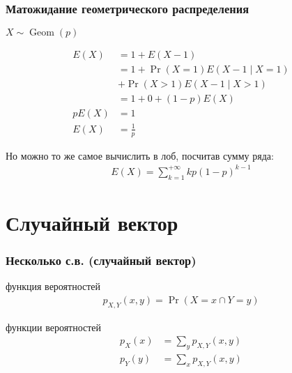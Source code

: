\documentclass[hyperref=unicode,graphics=pdflatex,13pt,xcolor={usenames,dvipsnames}]{beamer}
\renewcommand\emph[1]{{\color{blue}{#1}}}
\DeclareMathOperator{\Geom}{Geom}
\begin{document}
\begin{frame}
  \frametitle{Матожидание геометрического распределения}

  $X \sim \Geom(p)$

  \begin{align*}
    E(X)  &= 1 + E(X - 1) \\
          &= 1 + \Pr(X = 1) E(X - 1 \mid X = 1) \\
          &+ \Pr(X > 1) E(X - 1 \mid X > 1) \\
          &= 1 + 0 + (1 - p) E(X) \\
    pE(X) &= 1 \\
    E(X)  &= \frac{1}{p}
  \end{align*}

  \pause
  Но можно то же самое вычислить в лоб, посчитав сумму ряда:
  \begin{align*}
    E(X) = \sum_{k = 1}^{+\infty} k p(1 - p)^{k - 1}
  \end{align*}

\end{frame}

\section{Случайный вектор}
\begin{frame}
  \frametitle{Несколько с.в. (случайный вектор)}

  \emph{Совместная} функция вероятностей 
  \begin{align*}
    p_{X, Y}(x, y) = \Pr(X = x \cap Y = y)
  \end{align*}

  \emph{Маргинальные} функции вероятностей
  \begin{align*}
    p_X(x) &= \sum_y p_{X, Y}(x, y) \\
    p_Y(y) &= \sum_x p_{X, Y}(x, y)
  \end{align*}
\end{frame}
\end{document}
